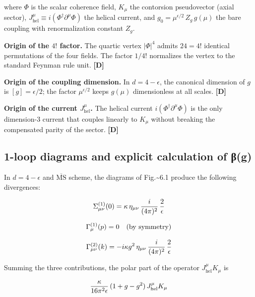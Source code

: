﻿\documentclass[11pt,letterpaper]{article}
\begin{document}
where $\Phi$ is the scalar coherence field, $K_\mu$ the contorsion pseudovector (axial sector), $J_{\text{hel}}^\mu \equiv i(\Phi^\dagger \partial^\mu \Phi)$ the helical current, and $g_0 = \mu^{\epsilon/2}\,Z_g\,g(\mu)$ the bare coupling with renormalization constant $Z_g$.

\textbf{Origin of the $4!$ factor.} The quartic vertex $|\Phi|^4$ admits $24 = 4!$ identical permutations of the four fields. The factor $1/4!$ normalizes the vertex to the standard Feynman rule unit. \textbf{[D]}

\textbf{Origin of the coupling dimension.} In $d = 4 - \epsilon$, the canonical dimension of $g$ is $[g] = \epsilon/2$; the factor $\mu^{\epsilon/2}$ keeps $g(\mu)$ dimensionless at all scales. \textbf{[D]}

\textbf{Origin of the current $J_{\text{hel}}^\mu$.} The helical current $i(\Phi^\dagger \partial^\mu \Phi)$ is the only dimension-3 current that couples linearly to $K_\mu$ without breaking the compensated parity of the sector. \textbf{[D]}
\subsection{1-loop diagrams and explicit calculation of β(g)}
In $d = 4 - \epsilon$ and $\overline{\text{MS}}$ scheme, the diagrams of Fig.\textasciitilde{}6.1 produce the following divergences:

\begin{equation*}
  \resizebox{\ifdim\width>\linewidth \linewidth\else\width\fi}{!}{$\displaystyle \Sigma_{\mu\nu}^{(1)}(0) = \kappa\,\eta_{\mu\nu}\,\frac{i}{(4\pi)^2}\,\frac{2}{\epsilon}$}
\end{equation*}

\begin{equation*}
  \resizebox{\ifdim\width>\linewidth \linewidth\else\width\fi}{!}{$\displaystyle \Gamma_\mu^{(1)}(p) = 0 \quad \text{(by symmetry)}$}
\end{equation*}

\begin{equation*}
  \resizebox{\ifdim\width>\linewidth \linewidth\else\width\fi}{!}{$\displaystyle \Gamma_{\mu\nu}^{(2)}(k) = -i\kappa g^2\,\eta_{\mu\nu}\,\frac{i}{(4\pi)^2}\,\frac{2}{\epsilon}$}
\end{equation*}

Summing the three contributions, the polar part of the operator $J_{\text{hel}}^\mu K_\mu$ is

\begin{equation*}
  \resizebox{\ifdim\width>\linewidth \linewidth\else\width\fi}{!}{$\displaystyle \frac{\kappa}{16\pi^2\epsilon}\,(1 + g - g^2)\,J_{\text{hel}}^\mu K_\mu$}
\end{equation*}
\end{document}
